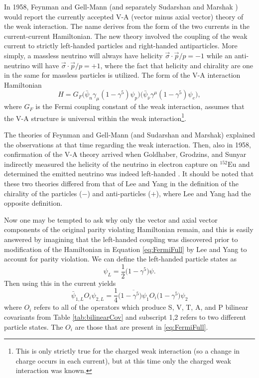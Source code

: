 In 1958, Feynman and Gell-Mann \cite{feynman1958} (and separately Sudarshan and Marshak
\cite{sudarshan1958}) would report the currently accepted V-A (vector minus axial vector)
theory of the weak interaction. The name derives from the form of the two currents in the
current-current Hamiltonian.
The new theory involved the coupling of the weak current to strictly left-handed particles and right-handed
antiparticles. More simply, a massless neutrino will always have helicity
$\vec{\sigma} \cdot \vec{p}/p = -1$ while an anti-neutrino will have $\vec{\sigma} \cdot \vec{p}/p = +1$,
where the fact that helicity and chirality are one in the same for massless particles is utilized.
The form of the V-A interaction Hamiltonian
%
\begin{equation}
  H = G_F \Big(\bar{\psi}_n \gamma_\mu(1-\gamma^5)\psi_p \Big)\Big(\bar{\psi}_{\bar{\nu}} \gamma^\mu(1-\gamma^5)\psi_e \Big),
  \label{eq:VminusA}
\end{equation}
%
where $G_F$ is the Fermi coupling constant of the weak interaction,
assumes that the V-A structure is universal within the weak interaction\footnote{This is
  only strictly true for the charged weak interaction (so a change in charge occurs in each current),
  but at this time only the charged weak interaction
  was known.}.

The theories of Feynman and Gell-Mann (and Sudarshan and Marshak)
explained the observations at that time
regarding the weak interaction. Then, also in 1958, confirmation of the V-A theory arrived when
Goldhaber, Grodzins, and Sunyar indirectly measured
the helicity of the neutrino in electron capture on $^{152}\mathrm{Eu}$ and determined the
emitted neutrino was indeed left-handed
\cite{goldhaber1958,greiner1996}. It should be noted that these two theories differed from that of
Lee and Yang in the definition of the chirality of the particles ($-$) and anti-particles ($+$), where
Lee and Yang had the opposite definition.

Now one may be tempted to ask why only the vector and axial vector components of the original
parity violating Hamiltonian remain, and this is easily answered by imagining that the
left-handed coupling was discovered prior to modification of the Hamiltonian in Equation
\ref{eq:FermiFull} by Lee and Yang to account for parity violation. We can define the left-handed
particle states as 
%
\begin{equation}
  \psi_L = \frac{1}{2}\big(1-\gamma^5\big)\psi.
\end{equation}
%
Then using this in the current yields
%
\begin{equation}
  \bar{\psi}_{1,L} O_i \psi_{2,L} = \frac{1}{4}\overline{\big(1-\gamma^5\big)\psi_{1}} O_i \big(1-\gamma^5\big)\psi_{2}
\end{equation}
%
where $O_i$ refers to all of the operators which produce S, V, T, A, and P bilinear covariants
from Table \ref{tab:bilinearCov} and subscript 1,2 refers to two different particle states.
The $O_i$ are those that are present in \ref{eq:FermiFull}.


